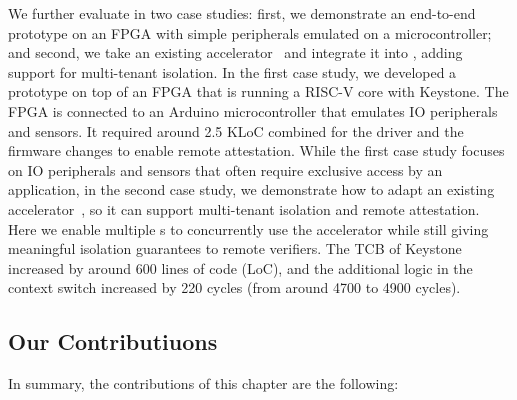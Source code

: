 We further evaluate \name{} in two case studies: first, we demonstrate an end-to-end prototype on an FPGA with simple peripherals emulated on a microcontroller; and second, we take an existing accelerator~\cite{zaruba2020manticore} and integrate it into \name{}, adding support for multi-tenant isolation. In the first case study, we developed a prototype on top of an FPGA that is running a RISC-V core with Keystone. The FPGA is connected to an Arduino microcontroller that emulates IO peripherals and sensors. It required around 2.5 KLoC combined for the driver and the firmware changes to enable remote attestation. 
While the first case study focuses on IO peripherals and sensors that often require exclusive access by an application, in the second case study, we demonstrate how to adapt an existing accelerator~\cite{zaruba2020manticore}, so it can support multi-tenant isolation and remote attestation. Here we enable multiple \name{}s to concurrently use the accelerator while still giving meaningful isolation guarantees to remote verifiers. The TCB of Keystone increased by around $600$ lines of code (LoC), and the additional logic in the context switch increased by 220 cycles (from around 4700 to 4900 cycles). 

\subsection{Our Contributiuons}

In summary, the contributions of this chapter are the following:

